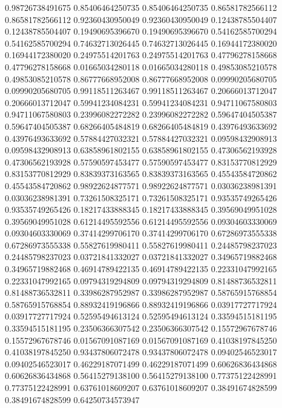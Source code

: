    0.98726738491675   0.85406464250735
   0.85406464250735   0.86581782566112
   0.86581782566112   0.92360430950049
   0.92360430950049   0.12438785504407
   0.12438785504407   0.19490695396670
   0.19490695396670   0.54162585700294
   0.54162585700294   0.74632713026445
   0.74632713026445   0.16944172380020
   0.16944172380020   0.24975514201763
   0.24975514201763   0.47796278158668
   0.47796278158668   0.01665034280118
   0.01665034280118   0.49853085210578
   0.49853085210578   0.86777668952008
   0.86777668952008   0.09990205680705
   0.09990205680705   0.99118511263467
   0.99118511263467   0.20666013712047
   0.20666013712047   0.59941234084231
   0.59941234084231   0.94711067580803
   0.94711067580803   0.23996082272282
   0.23996082272282   0.59647404505387
   0.59647404505387   0.68266405484819
   0.68266405484819   0.43976493633692
   0.43976493633692   0.57884427032321
   0.57884427032321   0.09598432908913
   0.09598432908913   0.63858961802155
   0.63858961802155   0.47306562193928
   0.47306562193928   0.57590597453477
   0.57590597453477   0.83153770812929
   0.83153770812929   0.83839373163565
   0.83839373163565   0.45543584720862
   0.45543584720862   0.98922624877571
   0.98922624877571   0.03036238981391
   0.03036238981391   0.73261508325171
   0.73261508325171   0.93535749265426
   0.93535749265426   0.18217433888345
   0.18217433888345   0.39569049951028
   0.39569049951028   0.61214495592556
   0.61214495592556   0.09304603330069
   0.09304603330069   0.37414299706170
   0.37414299706170   0.67286973555338
   0.67286973555338   0.55827619980411
   0.55827619980411   0.24485798237023
   0.24485798237023   0.03721841332027
   0.03721841332027   0.34965719882468
   0.34965719882468   0.46914789422135
   0.46914789422135   0.22331047992165
   0.22331047992165   0.09794319294809
   0.09794319294809   0.81488736532811
   0.81488736532811   0.33986287952987
   0.33986287952987   0.58765915768854
   0.58765915768854   0.88932419196866
   0.88932419196866   0.03917727717924
   0.03917727717924   0.52595494613124
   0.52595494613124   0.33594515181195
   0.33594515181195   0.23506366307542
   0.23506366307542   0.15572967678746
   0.15572967678746   0.01567091087169
   0.01567091087169   0.41038197845250
   0.41038197845250   0.93437806072478
   0.93437806072478   0.09402546523017
   0.09402546523017   0.46229187071499
   0.46229187071499   0.60626836434868
   0.60626836434868   0.56415279138100
   0.56415279138100   0.77375122428991
   0.77375122428991   0.63761018609207
   0.63761018609207   0.38491674828599
   0.38491674828599   0.64250734573947
